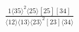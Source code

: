 \documentclass[varwidth, border=5pt]{standalone}
\begin{document}
\begin{my}
$\begin{gathered}
\scriptscriptstyle\frac{1⟨35⟩^2⟨25⟩[25][34]}{⟨12⟩⟨13⟩⟨23⟩^2[23]⟨34⟩}
\end{gathered}$
\end{my}
\end{document}
